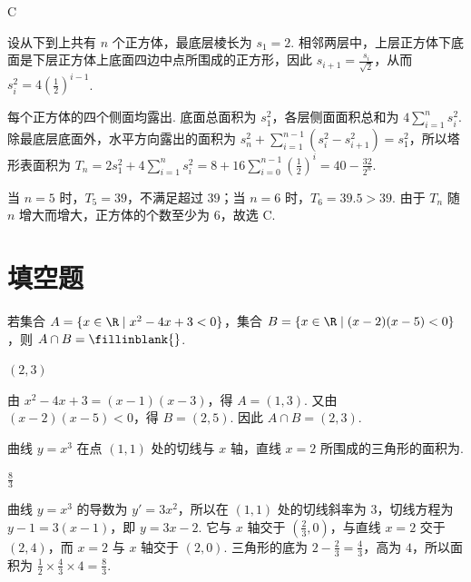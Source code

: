 \begin{answer}
C
\end{answer}

\begin{solution}
设从下到上共有 \(n\) 个正方体，最底层棱长为 \(s_1=2\). 相邻两层中，上层正方体下底面是下层正方体上底面四边中点所围成的正方形，因此 \(s_{i+1}=\frac{s_i}{\sqrt{2}}\)，从而 \(s_i^2=4\left(\frac12\right)^{i-1}\).

每个正方体的四个侧面均露出. 底面总面积为 \(s_1^2\)，各层侧面面积总和为 \(4\sum_{i=1}^n s_i^2\). 除最底层底面外，水平方向露出的面积为 \(s_n^2+\sum_{i=1}^{n-1}(s_i^2-s_{i+1}^2)=s_1^2\)，所以塔形表面积为 \(T_n=2s_1^2+4\sum_{i=1}^n s_i^2=8+16\sum_{i=0}^{n-1}\left(\frac12\right)^i=40-\frac{32}{2^n}\).

当 \(n=5\) 时，\(T_5=39\)，不满足超过 \(39\)；当 \(n=6\) 时，\(T_6=39.5>39\). 由于 \(T_n\) 随 \(n\) 增大而增大，正方体的个数至少为 \(6\)，故选 C.
\end{solution}

\section{填空题}
\begin{problem}
若集合 \(A = \{x \in \R \mid x^2 - 4x + 3 < 0\}\)，集合 \(B = \{x \in \R \mid (x - 2)(x - 5) < 0\}\)，则 \(A \cap B =\fillinblank{}\).
\end{problem}

\begin{answer}
\((2,3)\)
\end{answer}

\begin{solution}
由 \(x^2-4x+3=(x-1)(x-3)\)，得 \(A=(1,3)\). 又由 \((x-2)(x-5)<0\)，得 \(B=(2,5)\). 因此 \(A\cap B=(2,3)\).
\end{solution}

\begin{problem}
曲线 \(y = x^3\) 在点 \((1,1)\) 处的切线与 \(x\) 轴，直线 \(x = 2\) 所围成的三角形的面积为\fillinblank{}.
\end{problem}

\begin{answer}
\(\frac{8}{3}\)
\end{answer}

\begin{solution}
曲线 \(y=x^3\) 的导数为 \(y'=3x^2\)，所以在 \((1,1)\) 处的切线斜率为 \(3\)，切线方程为 \(y-1=3(x-1)\)，即 \(y=3x-2\). 它与 \(x\) 轴交于 \(\left(\frac23,0\right)\)，与直线 \(x=2\) 交于 \((2,4)\)，而 \(x=2\) 与 \(x\) 轴交于 \((2,0)\). 三角形的底为 \(2-\frac23=\frac43\)，高为 \(4\)，所以面积为 \(\frac12\times\frac43\times4=\frac83\).
\end{solution}

